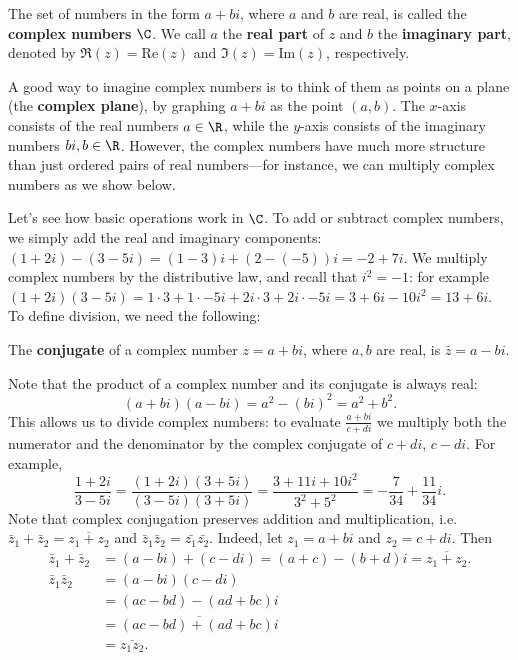\begin{df}
The set of numbers in the form $a+bi$, where $a$ and $b$ are real, is called the \textbf{complex numbers} $\C$. We call $a$ the \textbf{real part} of $z$ and $b$ the \textbf{imaginary part}, denoted by $\Re(z)=\text{Re}(z)$ and $\Im(z)=\text{Im}(z)$, respectively.
\end{df}

A good way to imagine complex numbers is to think of them as points on a plane (the \textbf{complex plane}), by graphing $a+bi$ as the point $(a,b)$. The $x$-axis consists of the real numbers $a\in \R$, while the $y$-axis consists of the imaginary numbers $bi,b\in \R$. However, the complex numbers have much more structure than just ordered pairs of real numbers---for instance, we can multiply complex numbers as we show below.

Let's see how basic operations work in $\C$. To add or subtract complex numbers, we simply add the real and imaginary components: $(1+2i)-(3-5i)=(1-3)i+(2-(-5))i=-2+7i$. We multiply complex numbers by the distributive law, and recall that $i^2=-1$: for example $(1+2i)(3-5i)=1\cdot 3+1\cdot -5i+2i\cdot 3+2i\cdot -5i=3+6i-10i^2=13+6i$. To define division, we need the following:
\begin{df}
The \textbf{conjugate} of a complex number $z=a+bi$, where $a,b$ are real, is $\bar z=a-bi$. 
\end{df}
Note that the product of a complex number and its conjugate is always real:
\[
(a+bi)(a-bi)=a^2-(bi)^2=a^2+b^2.
\]
This allows us to divide complex numbers: to evaluate $\frac{a+bi}{c+di}$ we multiply both the numerator and the denominator by the complex conjugate of $c+di$, $c-di$. For example,
\[
\frac{1+2i}{3-5i}=\frac{(1+2i)(3+5i)}{(3-5i)(3+5i)}=\frac{3+11i+10i^2}{3^2+5^2}=-\frac{7}{34}+\frac{11}{34}i.
\]
Note that complex conjugation preserves addition and multiplication, i.e. $\bar z_1+\bar z_2=\overline{z_1+z_2}$ and $\bar z_1\bar z_2=\bar{z_1}\bar{z_2}$. Indeed, let $z_1=a+bi$ and $z_2=c+di$. Then
\begin{align*}
\bar z_1+\bar z_2%
&=(a-bi)+(c-di)=(a+c)-(b+d)i=\overline{z_1+z_2}.\\
\bar z_1\bar z_2%
&=(a-bi)(c-di)\\
&=(ac-bd)-(ad+bc)i\\
&=\overline{(ac-bd)+(ad+bc)i}\\
&=\overline{z_1z_2}.
\end{align*}

